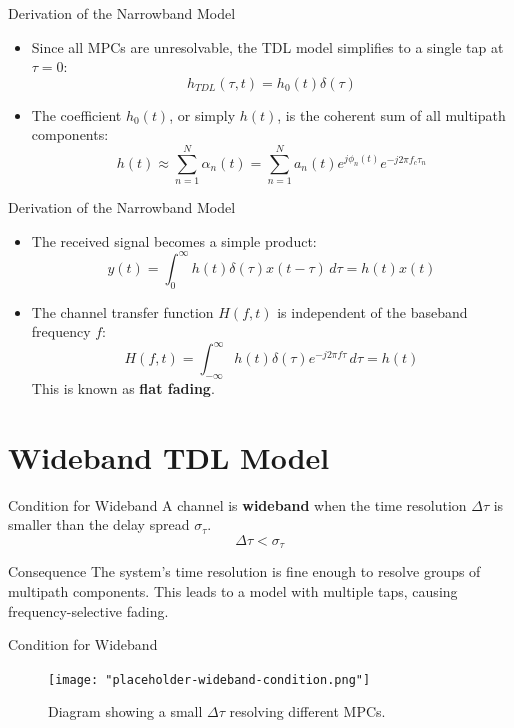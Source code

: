 \documentclass{beamer}
\begin{document}
	\begin{frame}{Derivation of the Narrowband Model}
		\begin{itemize}
			\item Since all MPCs are unresolvable, the TDL model simplifies to a single tap at $\tau=0$:
			\[ h_{TDL}(\tau, t) = h_0(t) \delta(\tau) \]
			
			\item The coefficient $h_0(t)$, or simply $h(t)$, is the coherent sum of all multipath components:
			\[ h(t) \approx \sum_{n=1}^{N} \alpha_n(t) = \sum_{n=1}^{N} a_n(t) e^{j\phi_n(t)} e^{-j2\pi f_c \tau_n} \]
		\end{itemize}
	\end{frame}
	
	\begin{frame}{Derivation of the Narrowband Model}
		\begin{itemize}
			\item The received signal becomes a simple product:
			\[ y(t) = \int_0^{\infty} h(t)\delta(\tau) x(t - \tau) \, d\tau = h(t)x(t) \]
			
			\item The channel transfer function $H(f,t)$ is independent of the baseband frequency $f$:
			\[ H(f,t) = \int_{-\infty}^{\infty} h(t)\delta(\tau) e^{-j2\pi f \tau} \, d\tau = h(t) \]
			This is known as \textbf{flat fading}.
		\end{itemize}
	\end{frame}
	
	\section{Wideband TDL Model}
	
	\begin{frame}{Condition for Wideband}
		A channel is \textbf{wideband} when the time resolution $\Delta\tau$ is smaller than the delay spread $\sigma_\tau$.
		\[ \Delta\tau < \sigma_\tau \]
		
		\begin{block}{Consequence}
			The system's time resolution is fine enough to resolve groups of multipath components. This leads to a model with multiple taps, causing frequency-selective fading.
		\end{block}
	\end{frame}
	
	\begin{frame}{Condition for Wideband}
		\begin{figure}
			\centering
			\texttt{[image: "placeholder-wideband-condition.png"]}
			\caption{Diagram showing a small $\Delta\tau$ resolving different MPCs.}
		\end{figure}
	\end{frame}
	
\end{document}

